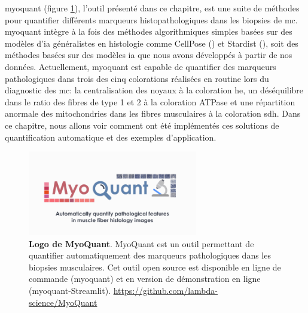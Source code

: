 \gls{myoquant} (figure \ref{fig:myoquant_logo}), l'outil présenté dans ce chapitre, est une suite de méthodes pour quantifier différents marqueurs histopathologiques dans les biopsies de \gls{mc}. \gls{myoquant} intègre à la fois des méthodes algorithmiques simples basées sur des modèles d'\gls{ia} généralistes en histologie comme CellPose (\cite{stringer_cellpose_2021}) et Stardist (\cite{weigert_star-convex_2020}), soit des méthodes basées sur des modèles \gls{ia} que nous avons développés à partir de nos données. Actuellement, \gls{myoquant} est capable de quantifier des marqueurs pathologiques dans trois des cinq colorations réalisées en routine lors du diagnostic des \gls{mc}: la centralisation des noyaux à la coloration \gls{he}, un déséquilibre dans le ratio des fibres de type 1 et 2 à la coloration ATPase et une répartition anormale des mitochondries dans les fibres musculaires à la coloration \gls{sdh}. Dans ce chapitre, nous allons voir comment ont été implémentés ces solutions de quantification automatique et des exemples d'application.

\begin{figure}[!htbp]
 \centering
 \includegraphics[width=0.66\textwidth]{figures/myoquant_logo.png}
 \caption[Logo MyoQuant]{\textbf{Logo de MyoQuant}. MyoQuant est un outil permettant de quantifier automatiquement des marqueurs pathologiques dans les biopsies musculaires. Cet outil open source est disponible en ligne de commande (\gls{myoquant}) et en version de démonstration en ligne (\gls{myoquant}-Streamlit). \url{https://github.com/lambda-science/MyoQuant}}
 \label{fig:myoquant_logo}
\end{figure}

